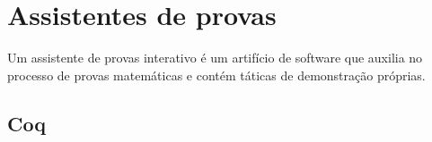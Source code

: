 \chapter{Assistentes de provas}

Um assistente de provas interativo é um artifício de software que auxilia no processo de provas matemáticas e contém táticas de demonstração próprias.

\section{Coq}
